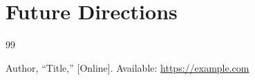 \documentclass[12pt,a4paper]{report}
\begin{document}
\section{Future Directions}


\begin{thebibliography}{99}

Author, ``Title,'' [Online]. Available: \url{https://example.com}

\end{thebibliography}
\end{document}
